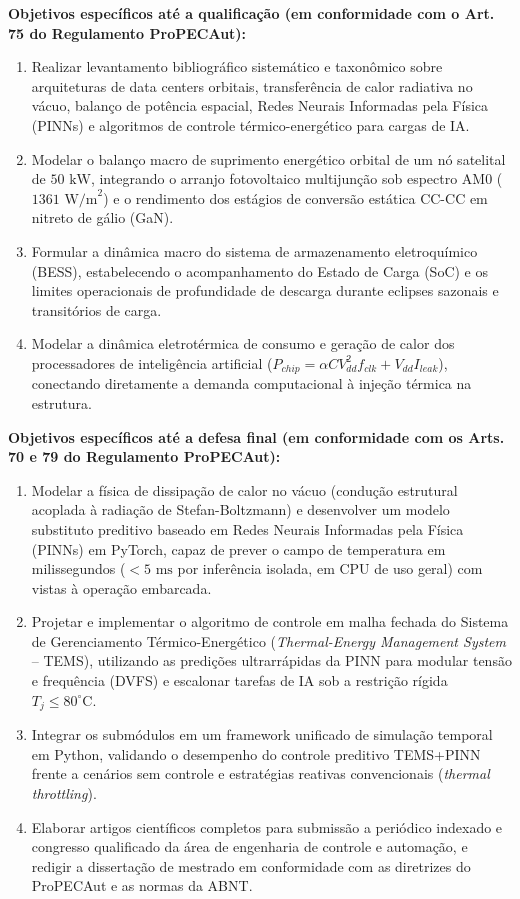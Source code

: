 \noindent\textbf{Objetivos específicos até a qualificação (em conformidade com o Art. 75 do Regulamento ProPECAut):}
\begin{enumerate}[label=\arabic*.]
    \item Realizar levantamento bibliográfico sistemático e taxonômico sobre arquiteturas de data centers orbitais, transferência de calor radiativa no vácuo, balanço de potência espacial, Redes Neurais Informadas pela Física (PINNs) e algoritmos de controle térmico-energético para cargas de IA.
    \item Modelar o balanço macro de suprimento energético orbital de um nó satelital de $50\text{ kW}$, integrando o arranjo fotovoltaico multijunção sob espectro AM0 ($1361\text{ W/m}^2$) e o rendimento dos estágios de conversão estática CC-CC em nitreto de gálio (GaN).
    \item Formular a dinâmica macro do sistema de armazenamento eletroquímico (BESS), estabelecendo o acompanhamento do Estado de Carga (SoC) e os limites operacionais de profundidade de descarga durante eclipses sazonais e transitórios de carga.
    \item Modelar a dinâmica eletrotérmica de consumo e geração de calor dos processadores de inteligência artificial ($P_{chip} = \alpha C V_{dd}^2 f_{clk} + V_{dd} I_{leak}$), conectando diretamente a demanda computacional à injeção térmica na estrutura.
\end{enumerate}

\noindent\textbf{Objetivos específicos até a defesa final (em conformidade com os Arts. 70 e 79 do Regulamento ProPECAut):}
\begin{enumerate}[label=\arabic*., resume]
    \item Modelar a física de dissipação de calor no vácuo (condução estrutural acoplada à radiação de Stefan-Boltzmann) e desenvolver um modelo substituto preditivo baseado em Redes Neurais Informadas pela Física (PINNs) em PyTorch, capaz de prever o campo de temperatura em milissegundos ($<5\text{ ms}$ por inferência isolada, em CPU de uso geral) com vistas à operação embarcada.
    \item Projetar e implementar o algoritmo de controle em malha fechada do Sistema de Gerenciamento Térmico-Energético (\textit{Thermal-Energy Management System} -- TEMS), utilizando as predições ultrarrápidas da PINN para modular tensão e frequência (DVFS) e escalonar tarefas de IA sob a restrição rígida $T_j \le 80^\circ\text{C}$.
    \item Integrar os submódulos em um framework unificado de simulação temporal em Python, validando o desempenho do controle preditivo TEMS+PINN frente a cenários sem controle e estratégias reativas convencionais (\textit{thermal throttling}).
    \item Elaborar artigos científicos completos para submissão a periódico indexado e congresso qualificado da área de engenharia de controle e automação, e redigir a dissertação de mestrado em conformidade com as diretrizes do ProPECAut e as normas da ABNT.
\end{enumerate}

